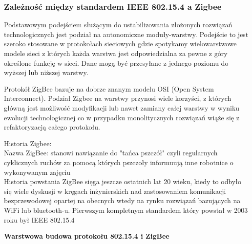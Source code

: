 \subsubsection{Zależność między standardem IEEE 802.15.4 a Zigbee }

\tab Podstawowym podejściem służącym do ustabilizowania złożonych rozwiązań technologicznych jest podział na autonomiczne moduły-warstwy. Podejście to jest szeroko stosowane w protokołach sieciowych gdzie spotykamy wielowarstwowe modele sieci z których każda warstwa jest odpowiedzialna za pewne z góry określone funkcję w sieci. Dane mogą być przesyłane z jednego poziomu do wyższej lub niższej warstwy.

\tab Protokół ZigBee bazuje na dobrze znanym modelu OSI (Open System Interconnect). Podział Zigbee na warstwy przynosi wiele korzyści, z których główną jest możliwość modyfikacji lub nawet zamiany całej warstwy w wyniku ewolucji technologicznej co w przypadku monolitycznych rozwiązań wiąże się z refaktoryzacją całego protokołu. \\

\par Historia Zigbee: \\ 

Nazwa ZigBee: stanowi nawiązanie do "tańca pszczół" czyli regularnych cyklicznych ruchów za pomocą których pszczoły informuują inne robotnice o wykonywanym zajęciu \\ 
\tab 	Historia powstania ZigBee sięga jeszcze ostatnich lat 20 wieku, kiedy to odbyło się wiele dyskusji w kręgach inżynierskich nad zastosowaniem komunikacji bezprzewodowej opartej na obecnych wtedy na rynku rozwiązań bazujących na WiFi lub bluetooth-u. Pierwszym kompletnym standardem który powstał w 2003 roku był IEEE 802.15.4 \\

\par \tab \textbf{Warstwowa budowa protokołu 802.15.4 i ZigBee} \\ 

